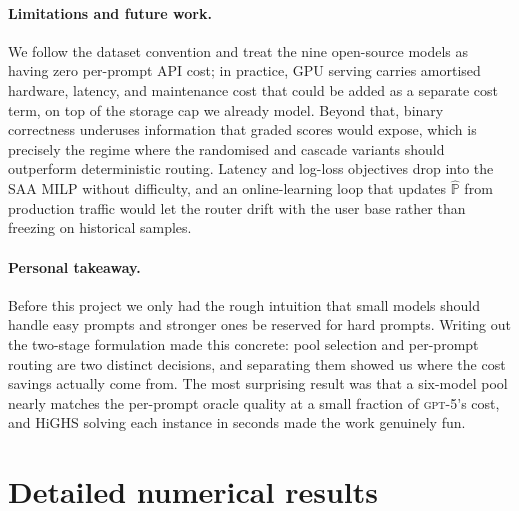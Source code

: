 \documentclass[11pt]{article}
\begin{document}
\paragraph{Limitations and future work.}
We follow the dataset convention and treat the nine open-source models as
having zero per-prompt API cost; in practice, GPU serving carries
amortised hardware, latency, and maintenance cost that could be added as a
separate cost term, on top of the storage cap we already model. Beyond
that, binary correctness underuses information that graded scores would
expose, which is precisely the regime where the randomised and cascade
variants should outperform deterministic routing. Latency and log-loss
objectives drop into the SAA MILP without difficulty, and an
online-learning loop that updates $\hat{\mathbb{P}}$ from production
traffic would let the router drift with the user base rather than freezing
on historical samples.

\paragraph{Personal takeaway.}
Before this project we only had the rough intuition that small models
should handle easy prompts and stronger ones be reserved for hard
prompts. Writing out the two-stage formulation made this concrete:
pool selection and per-prompt routing are two distinct decisions, and
separating them showed us where the cost savings actually come from.
The most surprising result was that a six-model pool nearly matches the
per-prompt oracle quality at a small fraction of \textsc{gpt-5}'s cost,
and HiGHS solving each instance in seconds made the work genuinely fun.

\newpage



\newpage
\appendix
\section{Detailed numerical results}
\label{app:tables}
\end{document}
